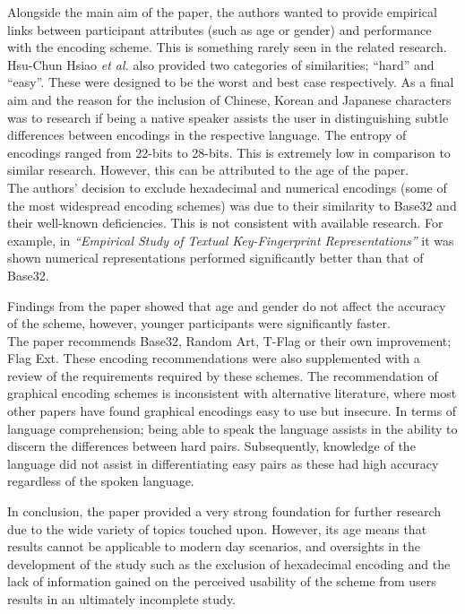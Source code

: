 Alongside the main aim of the paper, the authors wanted to provide empirical links between participant attributes (such as age or gender) and performance with the encoding scheme. This is something rarely seen in the related research. Hsu-Chun Hsiao \textit{et al.} also provided two categories of similarities; ``hard'' and ``easy''. These were designed to be the worst and best case respectively. As a final aim and the reason for the inclusion of Chinese, Korean and Japanese characters was to research if being a native speaker assists the user in distinguishing subtle differences between encodings in the respective language. The entropy of encodings ranged from 22-bits to 28-bits. This is extremely low in comparison to similar research. However, this can be attributed to the age of the paper. \\
The authors' decision to exclude hexadecimal and numerical encodings (some of the most widespread encoding schemes) was due to their similarity to Base32 and their well-known deficiencies. This is not consistent with available research. For example, in \textit{``Empirical Study of Textual Key-Fingerprint Representations''}\cite{dechand2016empirical} it was shown numerical representations performed significantly better than that of Base32.

Findings from the paper showed that age and gender do not affect the accuracy of the scheme, however, younger participants were significantly faster. \\
The paper recommends Base32, Random Art, T-Flag or their own improvement; Flag Ext. These encoding recommendations were also supplemented with a review of the requirements required by these schemes. The recommendation of graphical encoding schemes is inconsistent with alternative literature, where most other papers have found graphical encodings easy to use but insecure.
In terms of language comprehension; being able to speak the language assists in the ability to discern the differences between hard pairs. Subsequently, knowledge of the language did not assist in differentiating easy pairs as these had high accuracy regardless of the spoken language.

In conclusion, the paper provided a very strong foundation for further research due to the wide variety of topics touched upon. However, its age means that results cannot be applicable to modern day scenarios, and oversights in the development of the study such as the exclusion of hexadecimal encoding and the lack of information gained on the perceived usability of the scheme from users results in an ultimately incomplete study.

